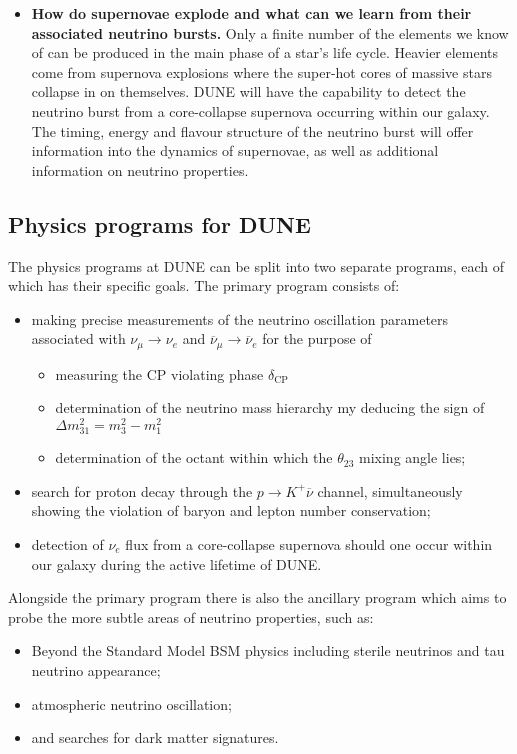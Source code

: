 \begin{itemize}
\item \textbf{How do supernovae explode and what can we learn from their associated neutrino bursts.} Only a finite number of the elements we know of can be produced in the main phase of a star's life cycle. Heavier elements come from supernova explosions where the super-hot cores of massive stars collapse in on themselves. DUNE will have the capability to detect the neutrino burst from a core-collapse supernova occurring within our galaxy. The timing, energy and flavour structure of the neutrino burst will offer information into the dynamics of supernovae, as well as additional information on neutrino properties.

\end{itemize} \cite{collaboration2016long}
\subsection{Physics programs for DUNE}
The physics programs at DUNE can be split into two separate programs, each of which has their specific goals.
The primary program consists of:
\begin{itemize}
\item making precise measurements of the neutrino oscillation parameters associated with $\nu_{\mu} \rightarrow \nu_{e}$ and $\overline{\nu}_{\mu} \rightarrow \overline{\nu}_{e}$ for the purpose of
\begin{itemize}
\item measuring the CP violating phase $\delta_{\textrm{CP}}$
\item determination of the neutrino mass hierarchy my deducing the sign of $\Delta m^{2}_{31} = m^{2}_{3} - m^{2}_{1}$
\item determination of the octant within which the $\theta_{23}$ mixing angle lies;
\end{itemize}

\item search for proton decay through the $p \rightarrow K^{+}\overline{\nu}$ channel, simultaneously showing the violation of baryon and lepton number conservation;  

\item detection of $\nu_{e}$ flux from a core-collapse supernova should one occur within our galaxy during the active lifetime of DUNE.
\end{itemize}

Alongside the primary program there is also the ancillary program which aims to probe the more subtle areas of neutrino properties, such as:
\begin{itemize}
\item Beyond the Standard Model {BSM} physics including sterile neutrinos and tau neutrino appearance;
\item atmospheric neutrino oscillation;
\item and searches for dark matter signatures.

\end{itemize}
  
